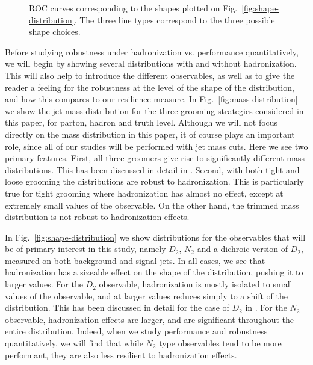 \documentclass[11pt,letterpaper]{article}
\DeclareRobustCommand{\Fig}[1]{Fig.~\ref{#1}}
\begin{document}
\begin{figure}
  \caption{ROC curves corresponding to the shapes plotted on
    Fig.~\ref{fig:shape-distribution}. The three line types correspond
    to the three possible shape choices.}\label{fig:rocs}
\end{figure}



Before studying robustness under hadronization vs. performance quantitatively, we will begin by showing several distributions with and without hadronization. This will also help to introduce the different observables, as well as to give the reader a feeling for the robustness at the level of the shape of the distribution, and how this compares to our resilience measure. In \Fig{fig:mass-distribution} we show the jet mass distribution for the three grooming strategies considered in this paper, for parton, hadron and truth level. Although we will not focus directly on the mass distribution in this paper, it of course plays an important role, since all of our studies will be performed with jet mass cuts. Here we see two primary features. First, all three groomers give rise to significantly different mass distributions. This has been discussed in detail in \cite{Dasgupta:2013ihk,Larkoski:2014wba}. Second, with both tight and loose grooming the distributions are robust to hadronization. This is particularly true for tight grooming where hadronization has almost no effect, except at extremely small values of the observable. On the other hand, the trimmed mass distribution is not robust to hadronization effects. 

In \Fig{fig:shape-distribution} we show distributions for the observables that will be of primary interest in this study, namely $D_2$, $N_2$ and a dichroic version of $D_2$, measured on both background and signal jets.   In all cases, we see that hadronization has a sizeable effect on the shape of the distribution, pushing it to larger values. For the $D_2$ observable, hadronization is mostly isolated to small values of the observable, and at larger values reduces simply to a shift of the distribution. This has been discussed in detail for the case of $D_2$ in \cite{Larkoski:2015kga,Larkoski:2017cqq,Larkoski:2017iuy}. For the $N_2$ observable, hadronization effects are larger, and are significant throughout the entire distribution. Indeed, when we study performance and robustness quantitatively, we will find that while $N_2$ type observables tend to be more performant, they are also less resilient to hadronization effects. 
\end{document}
